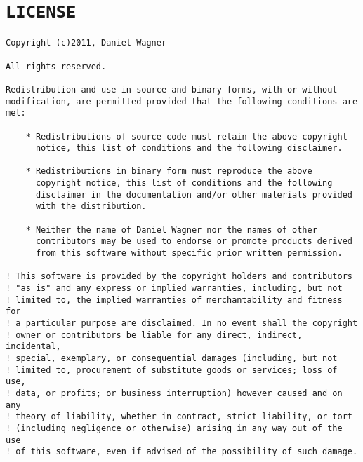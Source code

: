 \section{\texttt{LICENSE}}
\begin{verbatim}
Copyright (c)2011, Daniel Wagner

All rights reserved.

Redistribution and use in source and binary forms, with or without
modification, are permitted provided that the following conditions are met:

    * Redistributions of source code must retain the above copyright
      notice, this list of conditions and the following disclaimer.

    * Redistributions in binary form must reproduce the above
      copyright notice, this list of conditions and the following
      disclaimer in the documentation and/or other materials provided
      with the distribution.

    * Neither the name of Daniel Wagner nor the names of other
      contributors may be used to endorse or promote products derived
      from this software without specific prior written permission.

! This software is provided by the copyright holders and contributors
! "as is" and any express or implied warranties, including, but not
! limited to, the implied warranties of merchantability and fitness for
! a particular purpose are disclaimed. In no event shall the copyright
! owner or contributors be liable for any direct, indirect, incidental,
! special, exemplary, or consequential damages (including, but not
! limited to, procurement of substitute goods or services; loss of use,
! data, or profits; or business interruption) however caused and on any
! theory of liability, whether in contract, strict liability, or tort
! (including negligence or otherwise) arising in any way out of the use
! of this software, even if advised of the possibility of such damage.
\end{verbatim}

